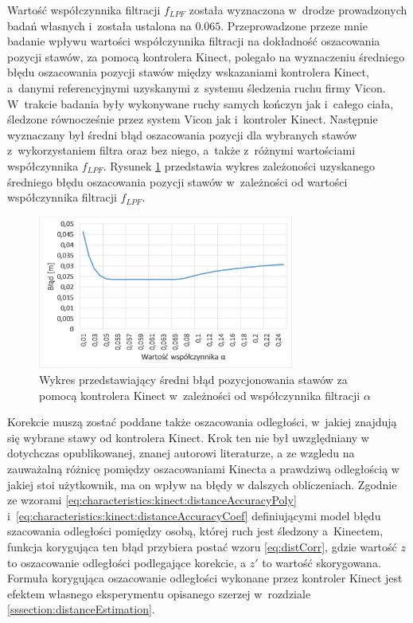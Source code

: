 Wartość współczynnika filtracji $f_{LPF}$ została wyznaczona w~drodze prowadzonych badań własnych i~została ustalona na $0.065$. Przeprowadzone przeze mnie badanie wpływu wartości współczynnika filtracji na dokładność oszacowania pozycji stawów, za pomocą kontrolera Kinect, polegało na wyznaczeniu średniego błędu oszacowania pozycji stawów między wskazaniami kontrolera Kinect, a~danymi referencyjnymi uzyskanymi z~systemu śledzenia ruchu firmy Vicon. W~trakcie badania były wykonywane ruchy samych kończyn jak i~całego ciała, śledzone równocześnie przez system Vicon jak i~kontroler Kinect. Następnie wyznaczany był średni błąd oszacowania pozycji dla wybranych stawów z~wykorzystaniem filtra oraz bez niego, a~także z~różnymi wartościami współczynnika $f_{LPF}$. Rysunek \ref{fig:hybrid:kinect:lpf} przedstawia wykres zależoności uzyskanego średniego błędu oszacowania pozycji stawów w~zależności od wartości współczynnika filtracji $f_{LPF}$. 
								
\begin{savenotes}
	\begin{figure}[h]
		\centering 
		\includegraphics[width=0.75\textwidth]{images/kinectPosErrorAlpha.png}
		\caption{Wykres przedstawiający średni błąd pozycjonowania stawów za pomocą kontrolera Kinect w~zależności od współczynnika filtracji $\alpha$}
		\label{fig:hybrid:kinect:lpf}
	\end{figure}
\end{savenotes}
										
Korekcie muszą zostać poddane także oszacowania odległości, w~jakiej znajdują się wybrane stawy od kontrolera Kinect. Krok ten nie był uwzględniany w dotychczas opublikowanej, znanej autorowi literaturze, a ze wzgledu na zauważalną różnicę pomiędzy oszacowaniami Kinecta a prawdziwą odległością w jakiej stoi użytkownik, ma on wpływ na błędy w dalszych obliczeniach. Zgodnie ze wzorami \ref{eq:characteristics:kinect:distanceAccuracyPoly} i~\ref{eq:characteristics:kinect:distanceAccuracyCoef} definiującymi model błędu szacowania odległości pomiędzy osobą, której ruch jest śledzony a~Kinectem, funkcja korygująca ten błąd przybiera postać wzoru \ref{eq:distCorr}, gdzie wartość $z$ to oszacowanie odległości podlegające korekcie, a $z'$ to wartość skorygowana. Formuła korygująca oszacowanie odległości wykonane przez kontroler Kinect jest efektem własnego eksperymentu opisanego szerzej w~rozdziale \ref{sssection:distanceEstimation}.
										
